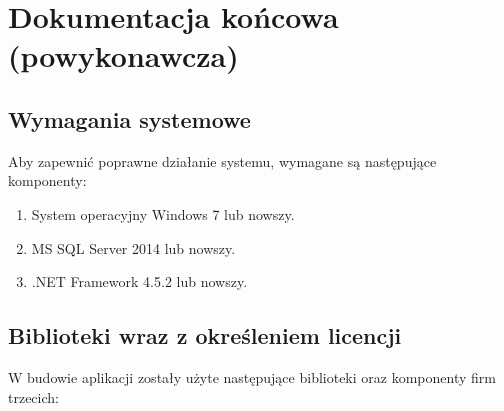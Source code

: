 \documentclass[10pt,a4paper]{article}
\begin{document}
\newpage
\section{Dokumentacja końcowa (powykonawcza)}

\subsection{Wymagania systemowe}
Aby zapewnić poprawne działanie systemu, wymagane są następujące komponenty:
\begin{enumerate}
	\item System operacyjny Windows 7 lub nowszy.
	\item MS SQL Server 2014 lub nowszy.
	\item .NET Framework 4.5.2 lub nowszy.
\end{enumerate}

\subsection{Biblioteki wraz z określeniem licencji}
W budowie aplikacji zostały użyte następujące biblioteki oraz komponenty firm trzecich:
\end{document}
